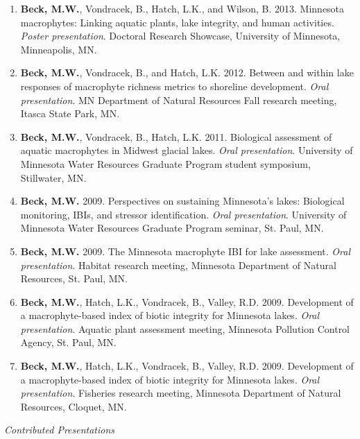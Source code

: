 \documentclass[letterpaper,12pt]{article}
\begin{document}
\begin{enumerate}
\item {\bf Beck, M.W.}, Vondracek, B., Hatch, L.K., and Wilson, B. 2013. Minnesota macrophytes: Linking aquatic plants, lake integrity, and human activities. \textit{Poster presentation}. Doctoral Research Showcase, University of Minnesota, Minneapolis, MN.

\item {\bf Beck, M.W.}, Vondracek, B., and Hatch, L.K. 2012. Between and within lake responses of macrophyte richness metrics to shoreline development. \textit{Oral presentation}. MN Department of Natural Resources Fall research meeting, Itasca State Park, MN.

\item {\bf Beck, M.W.}, Vondracek, B., Hatch, L.K. 2011. Biological assessment of aquatic macrophytes in Midwest glacial lakes. \textit{Oral presentation}. University of Minnesota Water Resources Graduate Program student symposium, Stillwater, MN.

\item {\bf Beck, M.W.} 2009. Perspectives on sustaining Minnesota's lakes: Biological monitoring, IBIs, and stressor identification. \textit{Oral presentation}. University of Minnesota Water Resources Graduate Program seminar, St. Paul, MN.

\item {\bf Beck, M.W.} 2009. The Minnesota macrophyte IBI for lake assessment. \textit{Oral presentation}. Habitat research meeting, Minnesota Department of Natural Resources, St. Paul, MN.

\item {\bf Beck, M.W.}, Hatch, L.K., Vondracek, B., Valley, R.D. 2009. Development of a macrophyte-based index of biotic integrity for Minnesota lakes. \textit{Oral presentation}. Aquatic plant assessment meeting, Minnesota Pollution Control Agency, St. Paul, MN.

\item {\bf Beck, M.W.}, Hatch, L.K., Vondracek, B., Valley, R.D. 2009. Development of a macrophyte-based index of biotic integrity for Minnesota lakes. \textit{Oral presentation}. Fisheries research meeting, Minnesota Department of Natural Resources, Cloquet, MN.

\end{enumerate}

\vspace{\baselineskip} 
\centerline{\large{\textit{Contributed Presentations}}}
\end{document}

